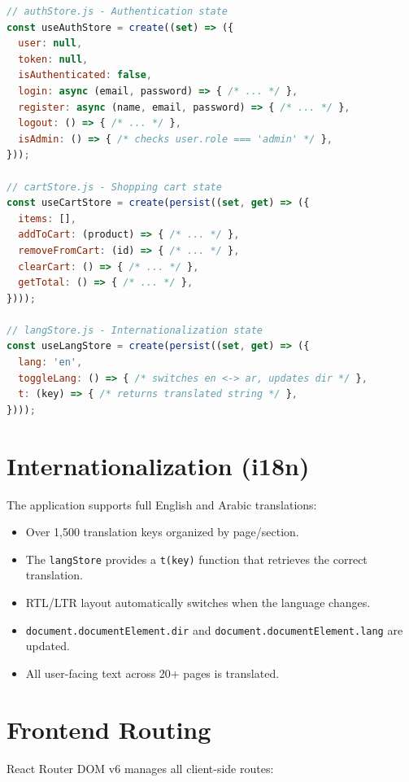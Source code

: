 \documentclass[12pt,a4paper]{report}
\begin{document}
\begin{lstlisting}[language=JavaScript, caption={Zustand Store Architecture}]
// authStore.js - Authentication state
const useAuthStore = create((set) => ({
  user: null,
  token: null,
  isAuthenticated: false,
  login: async (email, password) => { /* ... */ },
  register: async (name, email, password) => { /* ... */ },
  logout: () => { /* ... */ },
  isAdmin: () => { /* checks user.role === 'admin' */ },
}));

// cartStore.js - Shopping cart state
const useCartStore = create(persist((set, get) => ({
  items: [],
  addToCart: (product) => { /* ... */ },
  removeFromCart: (id) => { /* ... */ },
  clearCart: () => { /* ... */ },
  getTotal: () => { /* ... */ },
})));

// langStore.js - Internationalization state
const useLangStore = create(persist((set, get) => ({
  lang: 'en',
  toggleLang: () => { /* switches en <-> ar, updates dir */ },
  t: (key) => { /* returns translated string */ },
})));
\end{lstlisting}

\section{Internationalization (i18n)}
The application supports full English and Arabic translations:
\begin{itemize}[noitemsep]
  \item Over 1,500 translation keys organized by page/section.
  \item The \texttt{langStore} provides a \texttt{t(key)} function that retrieves the correct translation.
  \item RTL/LTR layout automatically switches when the language changes.
  \item \texttt{document.documentElement.dir} and \texttt{document.documentElement.lang} are updated.
  \item All user-facing text across 20+ pages is translated.
\end{itemize}

\section{Frontend Routing}
React Router DOM v6 manages all client-side routes:
\end{document}
